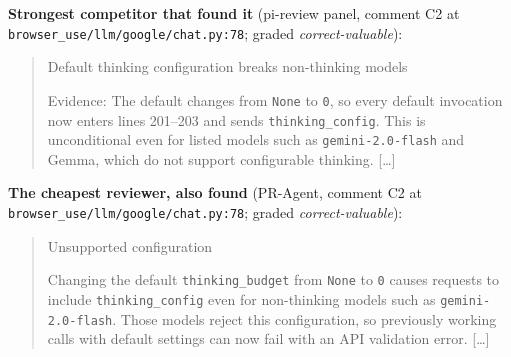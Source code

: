 \documentclass[11pt,a4paper]{article}
\newcommand{\code}[1]{\texttt{#1}}
\begin{document}
\noindent\textbf{Strongest competitor that found it} (pi-review panel, comment C2 at \code{browser\_use/\allowbreak{}llm/\allowbreak{}google/\allowbreak{}chat.py:78}; graded \emph{correct-valuable}):
\begin{quote}\small
Default thinking configuration breaks non-thinking models\par Evidence: The default changes from \texttt{None} to \texttt{0}, so every default invocation now enters lines 201--203 and sends \texttt{thinking\_config}. This is unconditional even for listed models such as \texttt{gemini-2.0-flash} and Gemma, which do not support configurable thinking. [\ldots]
\end{quote}
\noindent\textbf{The cheapest reviewer, also found} (PR-Agent, comment C2 at \code{browser\_use/\allowbreak{}llm/\allowbreak{}google/\allowbreak{}chat.py:78}; graded \emph{correct-valuable}):
\begin{quote}\small
Unsupported configuration\par Changing the default \texttt{thinking\_budget} from \texttt{None} to \texttt{0} causes requests to include \texttt{thinking\_config} even for non-thinking models such as \texttt{gemini-2.0-flash}. Those models reject this configuration, so previously working calls with default settings can now fail with an API validation error. [\ldots]
\end{quote}
\end{document}
